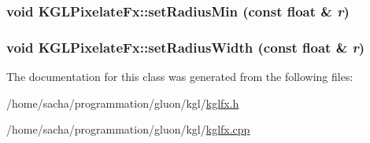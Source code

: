 \hypertarget{class_k_g_l_pixelate_fx_820ae55f76af24a334f80cd0d805f762}{
\subsubsection[{setRadiusMin}]{\setlength{\rightskip}{0pt plus 5cm}void KGLPixelateFx::setRadiusMin (const float \& {\em r})}}
\label{class_k_g_l_pixelate_fx_820ae55f76af24a334f80cd0d805f762}


\hypertarget{class_k_g_l_pixelate_fx_b846b6766342b4bc502d73afad6b7094}{
\subsubsection[{setRadiusWidth}]{\setlength{\rightskip}{0pt plus 5cm}void KGLPixelateFx::setRadiusWidth (const float \& {\em r})}}
\label{class_k_g_l_pixelate_fx_b846b6766342b4bc502d73afad6b7094}




The documentation for this class was generated from the following files:\begin{CompactItemize}
\item 
/home/sacha/programmation/gluon/kgl/\hyperlink{kglfx_8h}{kglfx.h}\item 
/home/sacha/programmation/gluon/kgl/\hyperlink{kglfx_8cpp}{kglfx.cpp}\end{CompactItemize}
